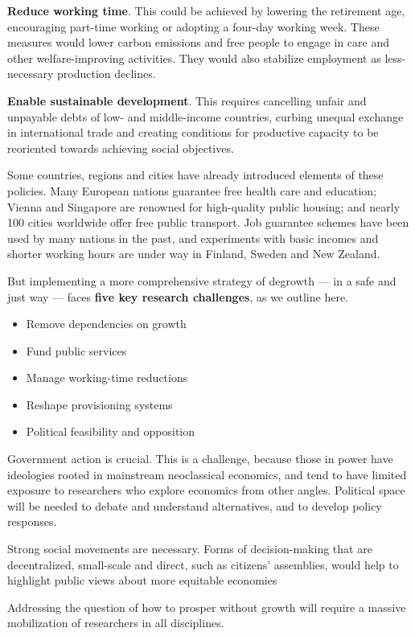 \documentclass[
]{book}
\providecommand{\tightlist}{%
  \setlength{\itemsep}{0pt}\setlength{\parskip}{0pt}}
\begin{document}
\textbf{Reduce working time}. This could be achieved by lowering the retirement age, encouraging part-time working or adopting a four-day working week. These measures would lower carbon emissions and free people to engage in care and other welfare-improving activities. They would also stabilize employment as less-necessary production declines.

\textbf{Enable sustainable development}. This requires cancelling unfair and unpayable debts of low- and middle-income countries, curbing unequal exchange in international trade and creating conditions for productive capacity to be reoriented towards achieving social objectives.

Some countries, regions and cities have already introduced elements of these policies. Many European nations guarantee free health care and education; Vienna and Singapore are renowned for high-quality public housing; and nearly 100 cities worldwide offer free public transport. Job guarantee schemes have been used by many nations in the past, and experiments with basic incomes and shorter working hours are under way in Finland, Sweden and New Zealand.

But implementing a more comprehensive strategy of degrowth --- in a safe and just way --- faces \textbf{five key research challenges}, as we outline here.

\begin{itemize}
\tightlist
\item
  Remove dependencies on growth
\item
  Fund public services
\item
  Manage working-time reductions
\item
  Reshape provisioning systems
\item
  Political feasibility and opposition
\end{itemize}

Government action is crucial. This is a challenge, because those in power have ideologies rooted in mainstream neoclassical economics, and tend to have limited exposure to researchers who explore economics from other angles. Political space will be needed to debate and understand alternatives, and to develop policy responses.

Strong social movements are necessary. Forms of decision-making that are decentralized, small-scale and direct, such as citizens' assemblies, would help to highlight public views about more equitable economies

Addressing the question of how to prosper without growth will require a massive mobilization of researchers in all disciplines.
\end{document}
